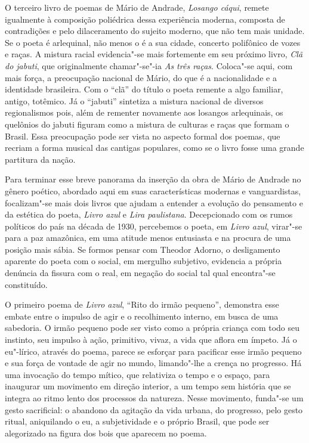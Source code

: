O terceiro livro de poemas de Mário de Andrade, \textit{Losango cáqui}, remete igualmente à composição poliédrica dessa experiência moderna, composta de contradições e pelo dilaceramento do sujeito moderno, que não tem mais unidade.
Se o poeta é arlequinal, não menos o é a sua cidade, concerto polifônico de vozes e raças. A mistura racial evidencia"-se mais fortemente em seu próximo livro, \textit{Clã do jabuti}, que originalmente chamar"-se"-ia \textit{As três raças}.
Coloca"-se aqui, com mais força, a preocupação nacional de Mário, do que é a nacionalidade e a identidade brasileira. Com o ``clã'' do título o poeta remente a algo familiar, antigo, totêmico. Já o ``jabuti'' sintetiza a mistura nacional de diversos regionalismos pois, além de rementer novamente aos losangos arlequinais, os quelônios do jabuti figuram como a mistura de culturas e raças que formam o Brasil. Essa preocupação pode ser vista no aspecto formal dos poemas, que recriam a forma musical das cantigas populares, como se o livro fosse uma grande partitura da nação.

Para terminar esse breve panorama da inserção da obra de Mário de Andrade no gênero poético, abordado aqui em suas características modernas e vanguardistas, focalizam"-se mais dois livros que ajudam a entender a evolução do pensamento e da estética do poeta, \textit{Livro azul} e \textit{Lira paulistana}.
Decepcionado com os rumos políticos do país na década de 1930, percebemos o poeta, em \textit{Livro azul}, virar"-se para a paz amazônica, em uma atitude menos entusiasta e na procura de uma posição mais sábia. 
Se formos pensar com Theodor Adorno, o desligamento aparente do poeta com o social, em mergulho subjetivo, evidencia a própria denúncia da fissura com o real, em negação do social tal qual encontra"-se constituído.

O primeiro poema de \textit{Livro azul}, ``Rito do irmão pequeno'', demonstra esse embate entre o impulso de agir e o recolhimento interno, em busca de uma sabedoria. O irmão pequeno pode ser visto como a própria criança com todo seu instinto, seu impulso à ação, primitivo, vivaz, a vida que aflora em ímpeto. Já o eu"-lírico, através do poema, parece se esforçar para pacificar esse irmão pequeno e sua força de vontade de agir no mundo, limando"-lhe a crença no progresso.
Há uma invocação do tempo mítico, que relativiza o tempo e o espaço, para inaugurar um movimento em direção interior, a um tempo sem história que se integra ao ritmo lento dos processos da natureza. Nesse movimento, funda"-se um gesto sacrificial: o abandono da agitação da vida urbana, do progresso, pelo gesto ritual, aniquilando o eu, a subjetividade e o próprio Brasil, que pode ser alegorizado na figura dos bois que aparecem no poema.

